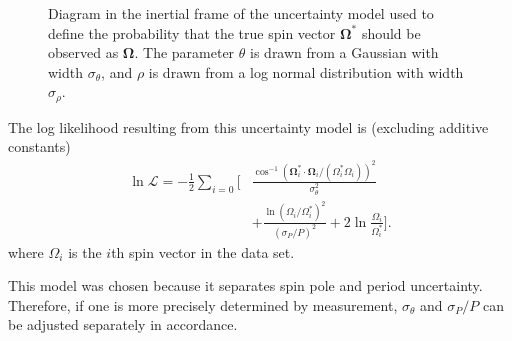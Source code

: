 \documentclass[fleqn,usenatbib]{mnras}
\newcommand{\unit}[1]{\bm{\hat{#1}}}
\newcommand{\parens}[1]{\left( #1 \right)}
\begin{document}
\begin{figure}
  \centering
  \caption{Diagram in the inertial frame of the uncertainty model used to define the probability that the true spin vector $\bm \Omega^*$ should be observed as $\bm \Omega$. The parameter $\theta$ is drawn from a Gaussian with width $\sigma_\theta$, and $\rho$ is drawn from a log normal distribution with width $\sigma_\rho$.}
  \label{fig:uncertainty-model}
\end{figure}

The log likelihood resulting from this uncertainty model is (excluding additive constants)
\begin{equation}
  \begin{split}
  \ln \mathcal{L} = -\frac{1}{2}\sum_{i = 0}\Bigg[&\frac{\cos^{-1} (\bm \Omega_i^* \cdot \bm \Omega_i/(\Omega_i^* \Omega_i))^2}{\sigma_\theta^2}\\
  &+\frac{\ln \parens{\Omega_i /\Omega_i^*}^2}{(\sigma_P / P)^2} + 2\ln\frac{\Omega_i}{\Omega_i^*}\Bigg].
  \end{split}
  \label{eqn:log-likelihood}
\end{equation}
where $\Omega_i$ is the $i$th spin vector in the data set.

This model was chosen because it separates spin pole and period uncertainty. Therefore, if one is more precisely determined by measurement, $\sigma_\theta$ and $\sigma_P / P$ can be adjusted separately in accordance.
\end{document}
